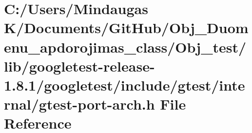 \hypertarget{_obj__test_2lib_2googletest-release-1_88_81_2googletest_2include_2gtest_2internal_2gtest-port-arch_8h}{}\section{C\+:/\+Users/\+Mindaugas K/\+Documents/\+Git\+Hub/\+Obj\+\_\+\+Duomenu\+\_\+apdorojimas\+\_\+class/\+Obj\+\_\+test/lib/googletest-\/release-\/1.8.1/googletest/include/gtest/internal/gtest-\/port-\/arch.h File Reference}
\label{_obj__test_2lib_2googletest-release-1_88_81_2googletest_2include_2gtest_2internal_2gtest-port-arch_8h}
